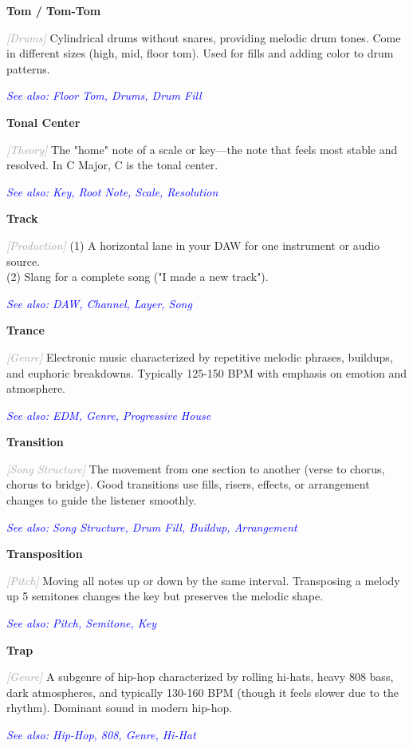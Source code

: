 \documentclass[11pt,letterpaper]{article}
\newcommand{\term}[1]{\textbf{\large\color{purple}#1}}
\newcommand{\category}[1]{\textcolor{darkgray}{\textit{\small [#1]}}}
\newcommand{\seealso}[1]{\textcolor{blue}{\textit{See also: #1}}}
\newenvironment{termdef}[1]
  {\noindent\term{#1}\par\nopagebreak}
  {\par\vspace{0.3em}}
\begin{document}
\begin{termdef}{Tom / Tom-Tom}
\category{Drums}
Cylindrical drums without snares, providing melodic drum tones. Come in different sizes (high, mid, floor tom). Used for fills and adding color to drum patterns.

\seealso{Floor Tom, Drums, Drum Fill}
\end{termdef}

\begin{termdef}{Tonal Center}
\category{Theory}
The "home" note of a scale or key—the note that feels most stable and resolved. In C Major, C is the tonal center.

\seealso{Key, Root Note, Scale, Resolution}
\end{termdef}

\begin{termdef}{Track}
\category{Production}
(1) A horizontal lane in your DAW for one instrument or audio source. \\
(2) Slang for a complete song ("I made a new track").

\seealso{DAW, Channel, Layer, Song}
\end{termdef}

\begin{termdef}{Trance}
\category{Genre}
Electronic music characterized by repetitive melodic phrases, buildups, and euphoric breakdowns. Typically 125-150 BPM with emphasis on emotion and atmosphere.

\seealso{EDM, Genre, Progressive House}
\end{termdef}

\begin{termdef}{Transition}
\category{Song Structure}
The movement from one section to another (verse to chorus, chorus to bridge). Good transitions use fills, risers, effects, or arrangement changes to guide the listener smoothly.

\seealso{Song Structure, Drum Fill, Buildup, Arrangement}
\end{termdef}

\begin{termdef}{Transposition}
\category{Pitch}
Moving all notes up or down by the same interval. Transposing a melody up 5 semitones changes the key but preserves the melodic shape.

\seealso{Pitch, Semitone, Key}
\end{termdef}

\begin{termdef}{Trap}
\category{Genre}
A subgenre of hip-hop characterized by rolling hi-hats, heavy 808 bass, dark atmospheres, and typically 130-160 BPM (though it feels slower due to the rhythm). Dominant sound in modern hip-hop.

\seealso{Hip-Hop, 808, Genre, Hi-Hat}
\end{termdef}
\end{document}
